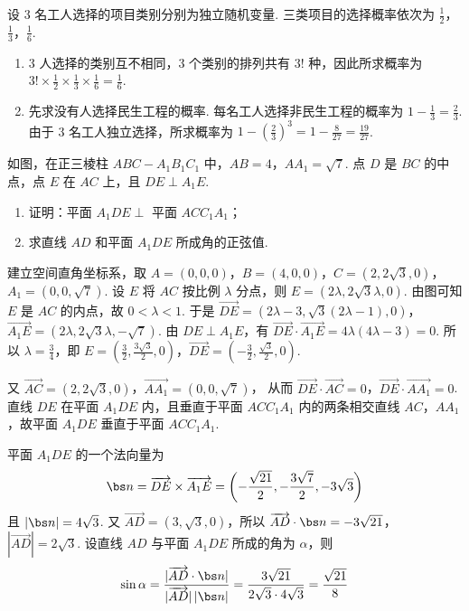 \begin{solution}
设 3 名工人选择的项目类别分别为独立随机变量. 三类项目的选择概率依次为 \(\frac12\)，\(\frac13\)，\(\frac16\).
\begin{enumerate}
\item 3 人选择的类别互不相同，3 个类别的排列共有 \(3!\) 种，因此所求概率为 \(3!\times\frac12\times\frac13\times\frac16=\frac16\).

\item 先求没有人选择民生工程的概率. 每名工人选择非民生工程的概率为 \(1-\frac13=\frac23\). 由于 3 名工人独立选择，所求概率为 \(1-\left(\frac23\right)^3=1-\frac{8}{27}=\frac{19}{27}\).
\end{enumerate}
\end{solution}

\begin{problem}
如图，在正三棱柱 \(ABC - A_{1}B_{1}C_{1}\) 中，\(AB = 4\)，\(AA_{1} = \sqrt{7}\). 点 \(D\) 是 \(BC\) 的中点，点 \(E\) 在 \(AC\) 上，且 \(DE \perp A_{1}E\).
\begin{enumerate}
\item 证明：平面 \( A_{1}DE \perp \) 平面 \(ACC_{1}A_{1}\)；
\item 求直线 \(AD\) 和平面 \(A_{1}DE\) 所成角的正弦值.
\end{enumerate}
\end{problem}

\begin{solution}
建立空间直角坐标系，取 \(A=(0,0,0)\)，\(B=(4,0,0)\)，\(C=(2,2\sqrt{3},0)\)，\(A_1=(0,0,\sqrt{7})\).
设 \(E\) 将 \(AC\) 按比例 \(\lambda\) 分点，则 \(E=(2\lambda,2\sqrt{3}\lambda,0)\).
由图可知 \(E\) 是 \(AC\) 的内点，故 \(0<\lambda<1\). 于是 \(\overrightarrow{DE}=(2\lambda-3,\sqrt{3}(2\lambda-1),0)\)，\(\overrightarrow{A_1E}=(2\lambda,2\sqrt{3}\lambda,-\sqrt{7})\).
由 \(DE\perp A_1E\)，有 \(\overrightarrow{DE}\cdot\overrightarrow{A_1E}=4\lambda(4\lambda-3)=0\).
所以 \(\lambda=\frac34\)，即 \(E=\left(\frac32,\frac{3\sqrt3}{2},0\right)\)，\(\overrightarrow{DE}=\left(-\frac32,\frac{\sqrt3}{2},0\right)\).

又 \(\overrightarrow{AC}=(2,2\sqrt3,0)\)，\(\overrightarrow{AA_1}=(0,0,\sqrt7)\)，
从而 \(\overrightarrow{DE}\cdot\overrightarrow{AC}=0\)，\(\overrightarrow{DE}\cdot\overrightarrow{AA_1}=0\).
直线 \(DE\) 在平面 \(A_1DE\) 内，且垂直于平面 \(ACC_1A_1\) 内的两条相交直线 \(AC\)，\(AA_1\)，故平面 \(A_1DE\) 垂直于平面 \(ACC_1A_1\).

平面 \(A_1DE\) 的一个法向量为
\[
\bs n=\overrightarrow{DE}\times\overrightarrow{A_1E}
=\left(-\frac{\sqrt{21}}2,-\frac{3\sqrt7}{2},-3\sqrt3\right)
\]
且 \(|\bs n|=4\sqrt3\). 又 \(\overrightarrow{AD}=(3,\sqrt3,0)\)，所以 \(\overrightarrow{AD}\cdot\bs n=-3\sqrt{21}\)，\(|\overrightarrow{AD}|=2\sqrt3\).
设直线 \(AD\) 与平面 \(A_1DE\) 所成的角为 \(\alpha\)，则
\[
\sin\alpha=\frac{|\overrightarrow{AD}\cdot\bs n|}{|\overrightarrow{AD}|\,|\bs n|}
=\frac{3\sqrt{21}}{2\sqrt3\cdot4\sqrt3}
=\frac{\sqrt{21}}8
\]
\end{solution}

